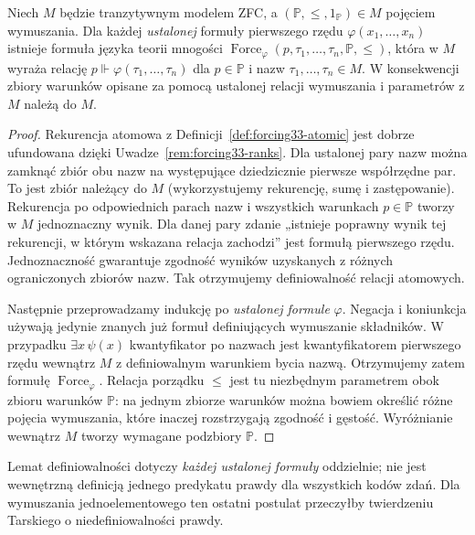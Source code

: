 \begin{twierdzenie}
\label{thm:forcing33-definability}
Niech $M$ będzie tranzytywnym
modelem ZFC, a
$(\mathbb P,\leq,1_{\mathbb P})\in M$
pojęciem wymuszania.
Dla każdej \emph{ustalonej}
formuły pierwszego rzędu
$\varphi(x_1,\ldots,x_n)$ istnieje
formuła języka teorii mnogości
$\operatorname{Force}_\varphi
(p,\tau_1,\ldots,\tau_n,\mathbb P,\leq)$,
która w $M$ wyraża relację
$p\Vdash\varphi(\tau_1,\ldots,\tau_n)$
dla $p\in\mathbb P$ i nazw
$\tau_1,\ldots,\tau_n\in M$.
W konsekwencji zbiory warunków
opisane za pomocą ustalonej relacji
wymuszania i parametrów z $M$
należą do $M$.
\end{twierdzenie}
\begin{proof}
Rekurencja atomowa
z Definicji~\ref{def:forcing33-atomic}
jest dobrze ufundowana dzięki
Uwadze~\ref{rem:forcing33-ranks}.
Dla ustalonej pary nazw można
zamknąć zbiór obu nazw na
występujące dziedzicznie pierwsze
współrzędne par. To jest zbiór
należący do $M$ (wykorzystujemy
rekurencję, sumę i zastępowanie).
Rekurencja po odpowiednich parach
nazw i wszystkich warunkach
$p\in\mathbb P$ tworzy w $M$
jednoznaczny wynik. Dla danej pary
zdanie „istnieje poprawny wynik
tej rekurencji, w którym wskazana
relacja zachodzi” jest formułą
pierwszego rzędu. Jednoznaczność
gwarantuje zgodność wyników
uzyskanych z różnych ograniczonych
zbiorów nazw. Tak otrzymujemy
definiowalność relacji atomowych.

Następnie przeprowadzamy indukcję
po \emph{ustalonej formule}
$\varphi$. Negacja i koniunkcja
używają jedynie znanych już
formuł definiujących wymuszanie
składników. W przypadku
$\exists x\,\psi(x)$ kwantyfikator
po nazwach jest kwantyfikatorem
pierwszego rzędu wewnątrz $M$
z definiowalnym warunkiem
bycia nazwą. Otrzymujemy zatem
formułę $\operatorname{Force}_\varphi$.
Relacja porządku $\leq$ jest tu
niezbędnym parametrem obok zbioru
warunków $\mathbb P$: na jednym
zbiorze warunków można bowiem
określić różne pojęcia wymuszania,
które inaczej rozstrzygają zgodność
i gęstość. Wyróżnianie wewnątrz $M$
tworzy wymagane podzbiory
$\mathbb P$.
\end{proof}

\begin{uwaga}
\label{rem:forcing33-tarski}
Lemat definiowalności dotyczy
\emph{każdej ustalonej formuły}
oddzielnie; nie jest wewnętrzną
definicją jednego predykatu prawdy
dla wszystkich kodów zdań.
Dla wymuszania jednoelementowego
ten ostatni postulat przeczyłby
twierdzeniu Tarskiego o
niedefiniowalności prawdy.
\end{uwaga}

